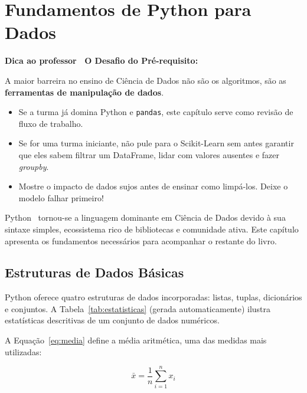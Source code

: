 \documentclass[
    12pt,
    oneside,
    a4paper,
    english,
    brazilian
    ]{abntex2}
\numberwithin{equation}{chapter}
\newenvironment{dica}{%
    \par\medskip
    \color{blue!60!black}\small\itshape
}{%
    \par\medskip
}
\begin{document}
\chapter{Fundamentos de Python para Dados}

\begin{dica}
\noindent\textbf{Dica ao professor \textemdash\ O Desafio do Pré-requisito:}

A maior barreira no ensino de Ciência de Dados não são os algoritmos, são as \textbf{ferramentas de manipulação de dados}.
\begin{itemize}
    \item Se a turma já domina Python e \texttt{pandas}, este capítulo serve como revisão de fluxo de trabalho.
    \item Se for uma turma iniciante, não pule para o Scikit-Learn sem antes garantir que eles sabem filtrar um DataFrame, lidar com valores ausentes e fazer \textit{groupby}.
    \item Mostre o impacto de dados sujos antes de ensinar como limpá-los. Deixe o modelo falhar primeiro!
\end{itemize}
\end{dica}

Python~\cite{mckinney2022} tornou-se a linguagem dominante em Ciência de Dados devido à sua sintaxe simples, ecossistema rico de bibliotecas e comunidade ativa. Este capítulo apresenta os fundamentos necessários para acompanhar o restante do livro.

\section{Estruturas de Dados Básicas}

Python oferece quatro estruturas de dados incorporadas: listas, tuplas, dicionários e conjuntos. A Tabela~\ref{tab:estatisticas} (gerada automaticamente) ilustra estatísticas descritivas de um conjunto de dados numéricos.



A Equação~\ref{eq:media} define a média aritmética, uma das medidas mais utilizadas:

\begin{equation}
    \bar{x} = \frac{1}{n} \sum_{i=1}^{n} x_i
    \label{eq:media}
\end{equation}
\end{document}
